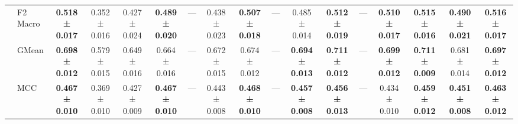 \begin{table}[H]
{\begin{tabular}{llccccccccccccccc}
 & F2 Macro & \textbf{0.518 ± 0.017} & 0.352 ± 0.016 & 0.427 ± 0.024 & \textbf{0.489 ± 0.020} & — & 0.438 ± 0.023 & \textbf{0.507 ± 0.018} & — & 0.485 ± 0.014 & \textbf{0.512 ± 0.019} & — & \textbf{0.510 ± 0.017} & \textbf{0.515 ± 0.016} & \textbf{0.490 ± 0.021} & \textbf{0.516 ± 0.017} \\
 & GMean & \textbf{0.698 ± 0.012} & 0.579 ± 0.015 & 0.649 ± 0.016 & 0.664 ± 0.016 & — & 0.672 ± 0.015 & 0.674 ± 0.012 & — & \textbf{0.694 ± 0.013} & \textbf{0.711 ± 0.012} & — & \textbf{0.699 ± 0.012} & \textbf{0.711 ± 0.009} & 0.681 ± 0.014 & \textbf{0.697 ± 0.012} \\
 & MCC & \textbf{0.467 ± 0.010} & 0.369 ± 0.010 & 0.427 ± 0.009 & \textbf{0.467 ± 0.010} & — & 0.443 ± 0.008 & \textbf{0.468 ± 0.010} & — & \textbf{0.457 ± 0.008} & \textbf{0.456 ± 0.013} & — & 0.434 ± 0.010 & \textbf{0.459 ± 0.012} & \textbf{0.451 ± 0.008} & \textbf{0.463 ± 0.012} \\
\cline{1-17}
\bottomrule
\end{tabular}
    }
\end{table}
